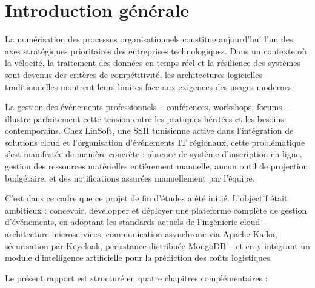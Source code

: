 \documentclass[12pt,a4paper]{report}
\begin{document}
\chapter*{Introduction g\'en\'erale}

La num\'erisation des processus organisationnels constitue aujourd'hui l'un des axes
strat\'egiques prioritaires des entreprises technologiques. Dans un contexte o\`u la
v\'elocit\'e, la traitement des donn\'ees en temps r\'eel et la r\'esilience des syst\`emes sont
devenus des crit\`eres de comp\'etitivit\'e, les architectures logicielles traditionnelles
montrent leurs limites face aux exigences des usages modernes.

La gestion des \'ev\'enements professionnels -- conf\'erences, workshops, forums -- illustre
parfaitement cette tension entre les pratiques h\'erit\'ees et les besoins contemporains.
Chez LinSoft, une SSII tunisienne active dans l'int\'egration de solutions cloud et
l'organisation d'\'ev\'enements IT r\'egionaux, cette probl\'ematique s'est manifest\'ee de
mani\`ere concr\`ete : absence de syst\`eme d'inscription en ligne, gestion des ressources
mat\'erielles enti\`erement manuelle, aucun outil de projection budg\'etaire, et des
notifications assur\'ees manuellement par l'\'equipe.

C'est dans ce cadre que ce projet de fin d'\'etudes a \'et\'e initi\'e. L'objectif \'etait ambitieux :
concevoir, d\'evelopper et d\'eployer une plateforme compl\`ete de gestion d'\'ev\'enements, en
adoptant les standards actuels de l'ing\'enierie cloud -- architecture microservices,
communication asynchrone via Apache Kafka, s\'ecurisation par Keycloak, persistance
distribu\'ee MongoDB -- et en y int\'egrant un module d'intelligence artificielle pour
la pr\'ediction des co\^uts logistiques.

Le pr\'esent rapport est structur\'e en quatre chapitres compl\'ementaires :
\end{document}
